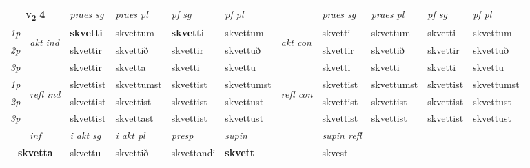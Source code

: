 \noindent
\begin{tabular}{lllllllllll} \toprule
\multicolumn{2}{c}{\textbf{v{\textsubscript{2}}} \Large{\textbf{4}}}  &  \textit{praes sg}  & \textit{praes pl}  &\textit{ pf sg} & \textit{pf pl} &  &  \textit{praes sg}  & \textit{praes pl}  & \textit{pf sg} & \textit{pf pl } \\*
	\cmidrule{3-6} \cmidrule{8-11}
 {\textit{1p}} & \multirow{3}{*}{\begin{turn}{90}\textit{akt ind}\end{turn}} & \textbf{skvetti} & skvettum & \textbf{skvetti} & skvettum & \multirow{3}{*}{\begin{turn}{90}\textit{akt con}\end{turn}} &skvetti & skvettum & skvetti & skvettum\\*
 {\textit{2p}} &  &  skvettir  & skvettið & skvettir & skvettuð & & skvettir & skvettið & skvettir & skvettuð \\*
{\textit{3p}} &  & skvettir & skvetta & skvetti & skvettu & & skvetti & skvetti& skvetti & skvettu \\*
\cmidrule{3-6} \cmidrule{8-11}
 {\textit{1p}} & \multirow{3}{*}{\begin{turn}{90}\textit{refl ind}\end{turn}}  & skvettist & skvettumst & skvettist & skvettumst & \multirow{3}{*}{\begin{turn}{90}\textit{refl con}\end{turn}}  &skvettist & skvettumst & skvettist & skvettumst \\*
 {\textit{2p}} &  & skvettist & skvettist & skvettist & skvettust & &skvettist & skvettist & skvettist & skvettust \\*
 {\textit{3p}}  & & skvettist & skvettast & skvettist & skvettust & & skvettist & skvettist& skvettist & skvettust \\*
\cmidrule{3-6} \cmidrule{8-11}

   \multicolumn{2}{c}{\textit{inf}}  & \textit{i akt sg} & \textit{i akt pl}   & \textit{presp} & \textit{supin} && \textit{supin refl}  \\*
  \multicolumn{2}{c}{\textbf{skvetta}} & skvettu  & skvettið   & skvettandi &  \textbf{skvett} && skvest  \\*
\end{tabular}

